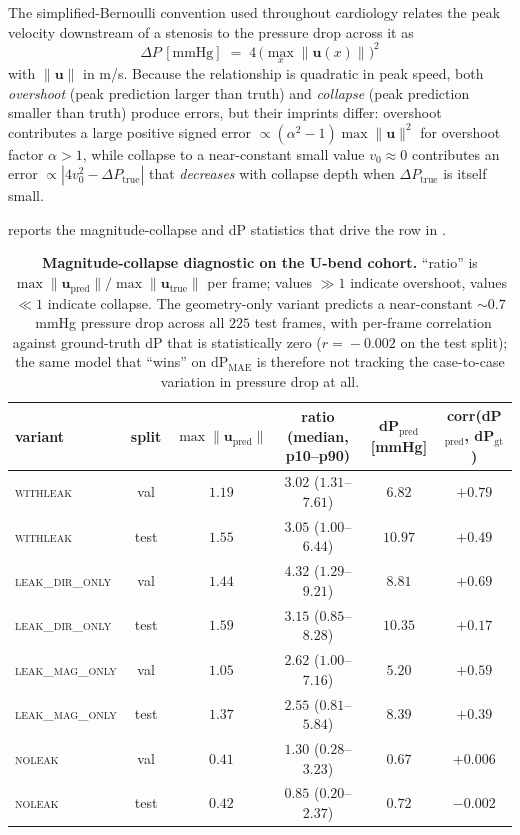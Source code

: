 \documentclass[10pt,a4paper]{article}
\newcommand{\withleak}{\textsc{withleak}}
\newcommand{\dironly}{\textsc{leak\_dir\_only}}
\newcommand{\magonly}{\textsc{leak\_mag\_only}}
\newcommand{\noleak}{\textsc{noleak}}
\begin{document}
The simplified-Bernoulli convention used throughout cardiology
relates the peak velocity downstream of a stenosis to the pressure
drop across it as
\begin{equation}
\Delta P\,[\mathrm{mmHg}] \;=\; 4 \,\bigl(\max_x \|\mathbf{u}(x)\|\bigr)^{2}
\label{eq:bernoulli}
\end{equation}
with $\|\mathbf{u}\|$ in m/s. Because the relationship is quadratic
in peak speed, both \emph{overshoot} (peak prediction larger than
truth) and \emph{collapse} (peak prediction smaller than truth)
produce errors, but their imprints differ: overshoot contributes a
large positive signed error $\propto (\alpha^{2}-1)\max\|\mathbf{u}\|^{2}$
for overshoot factor $\alpha\!>\!1$, while collapse to a near-constant
small value $v_0\!\approx\!0$ contributes an error
$\propto |4 v_0^{2} - \Delta P_\mathrm{true}|$ that \emph{decreases}
with collapse depth when $\Delta P_\mathrm{true}$ is itself small.

 reports the magnitude-collapse and dP statistics
that drive the row in .

\begin{table}[h]
\centering
\small
\begin{tabular}{lccccc}
\toprule
variant & split & $\max\|\mathbf{u}_\mathrm{pred}\|$ & ratio (median, p10--p90) & dP$_\mathrm{pred}$ [mmHg] & corr(dP$_\mathrm{pred}$, dP$_\mathrm{gt}$) \\
\midrule
\withleak{}  & val  & $1.19$ & $3.02$ ($1.31$--$7.61$) & $6.82$  & $\mathbf{+0.79}$ \\
\withleak{}  & test & $1.55$ & $3.05$ ($1.00$--$6.44$) & $10.97$ & $\mathbf{+0.49}$ \\
\dironly{}   & val  & $1.44$ & $4.32$ ($1.29$--$9.21$) & $8.81$  & $+0.69$ \\
\dironly{}   & test & $1.59$ & $3.15$ ($0.85$--$8.28$) & $10.35$ & $+0.17$ \\
\magonly{}   & val  & $1.05$ & $2.62$ ($1.00$--$7.16$) & $5.20$  & $+0.59$ \\
\magonly{}   & test & $1.37$ & $2.55$ ($0.81$--$5.84$) & $8.39$  & $+0.39$ \\
\noleak{}    & val  & $0.41$ & $1.30$ ($0.28$--$3.23$) & $0.67$  & $\mathbf{+0.006}$ \\
\noleak{}    & test & $0.42$ & $0.85$ ($0.20$--$2.37$) & $0.72$  & $\mathbf{-0.002}$ \\
\bottomrule
\end{tabular}
\caption{\textbf{Magnitude-collapse diagnostic on the U-bend cohort.}
``ratio'' is $\max\|\mathbf{u}_\mathrm{pred}\|/\max\|\mathbf{u}_\mathrm{true}\|$
per frame; values $\gg\!1$ indicate overshoot, values $\ll\!1$ indicate
collapse. The geometry-only variant predicts a near-constant
$\sim\!0.7$~mmHg pressure drop across all $225$ test frames, with
per-frame correlation against ground-truth dP that is statistically
zero ($r\!=\!-0.002$ on the test split); the same model that
``wins'' on dP$_\mathrm{MAE}$ is therefore not tracking the
case-to-case variation in pressure drop at all.}
\label{tab:dp_inv}
\end{table}
\end{document}
